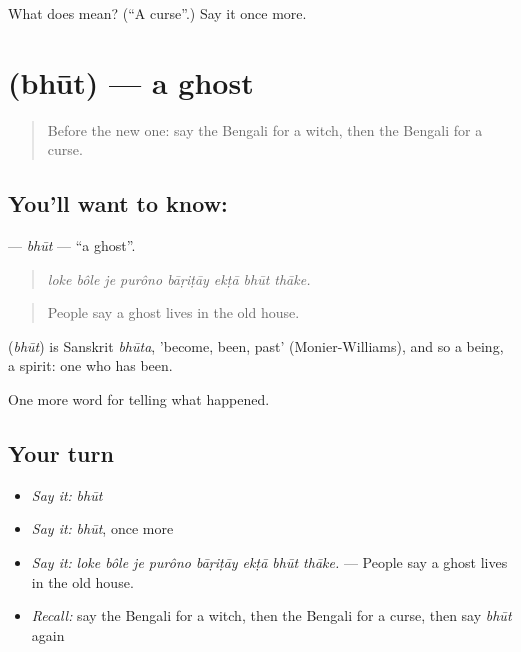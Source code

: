 \begin{tcolorbox}[breakable,colback=teal!4,colframe=teal!35!black,title={Before you move on}]
What does  mean? (\textquotedblleft{}A curse\textquotedblright{}.) Say it once more.
\end{tcolorbox}
\section[\texorpdfstring{\bn{ভূত} (bhūt)}{ভূত (bhūt)}]{ (bhūt) — a ghost}

\label{lesson:BN-C322-bhut}



\begin{quote}
Before the new one: say the Bengali for a witch, then the Bengali for a curse.
\end{quote}

\subsection*{You'll want to know: }
\textbf{} — \emph{bhūt} — \textquotedblleft{}a ghost\textquotedblright{}.

\begin{quote}
       
\end{quote}

\begin{quote}
\emph{loke bôle je purôno bāṛiṭāy ekṭā bhūt thāke.}
\end{quote}

\begin{quote}
People say a ghost lives in the old house.
\end{quote}

\begin{cousinweb}
\textbf{} (\emph{bhūt}) is Sanskrit \emph{bhūta}, 'become, been, past' (Monier-Williams), and so a being, a spirit: one who has been.
\end{cousinweb}

\begin{grammarlens}[title={What you've built}]
One more word for telling what happened.
\end{grammarlens}

\subsection*{Your turn}
\begin{itemize}
\raggedright
  \item \emph{Say it:} \emph{bhūt}
  \item \emph{Say it:} \emph{bhūt}, once more
  \item \emph{Say it:} \emph{loke bôle je purôno bāṛiṭāy ekṭā bhūt thāke.} — People say a ghost lives in the old house.
  \item \emph{Recall:} say the Bengali for a witch, then the Bengali for a curse, then say \emph{bhūt} again
\end{itemize}

